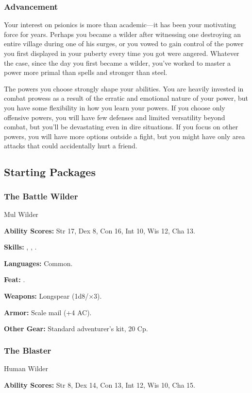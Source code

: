 \subsubsection{Advancement}
Your interest on psionics is more than academic---it has been your motivating force for years. Perhaps you became a wilder after witnessing one destroying an entire village during one of his surges, or you vowed to gain control of the power you first displayed in your puberty every time you got were angered. Whatever the case, since the day you first became a wilder, you've worked to master a power more primal than spells and stronger than steel.

The powers you choose strongly shape your abilities. You are heavily invested in combat prowess as a result of the erratic and emotional nature of your power, but you have some flexibility in how you learn your powers. If you choose only offensive powers, you will have few defenses and limited versatility beyond combat, but you'll be devastating even in dire situations. If you focus on other powers, you will have more options outside a fight, but you might have only area attacks that could accidentally hurt a friend.

\subsection{Starting Packages}
\subsubsection{The Battle Wilder}
Mul Wilder

\textbf{Ability Scores:} Str 17, Dex 8, Con 16, Int 10, Wis 12, Cha 13.

\textbf{Skills:} , , .

\textbf{Languages:} Common.

\textbf{Feat:} .

\textbf{Weapons:} Longspear (1d8/$\times$3).

\textbf{Armor:} Scale mail (+4 AC).

\textbf{Other Gear:} Standard adventurer's kit, 20 Cp.

\subsubsection{The Blaster}
Human Wilder

\textbf{Ability Scores:} Str 8, Dex 14, Con 13, Int 12, Wis 10, Cha 15.

